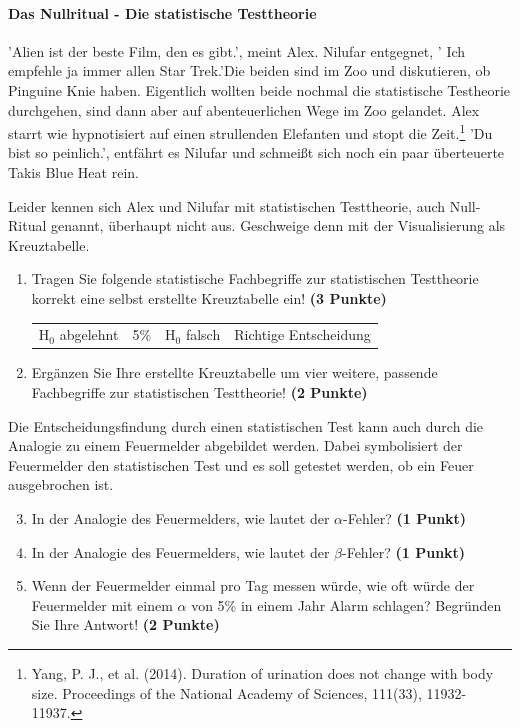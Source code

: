 \documentclass[a4paper, 9pt]{scrartcl}\usepackage[]{graphicx}\usepackage[]{xcolor}
\begin{document}
\ifcollection
\paragraph{Das Nullritual - Die statistische Testtheorie}
\fi

'Alien ist der beste Film, den es gibt.', meint Alex. Nilufar entgegnet, ' Ich empfehle ja immer allen Star Trek.'Die beiden sind im Zoo und diskutieren, ob Pinguine Knie haben. Eigentlich wollten beide nochmal die statistische Testheorie durchgehen, sind dann aber auf abenteuerlichen Wege im Zoo gelandet. Alex starrt wie hypnotisiert auf einen strullenden Elefanten und stopt die Zeit.\footnote{Yang, P. J., et al. (2014). Duration of urination does not change with body size. Proceedings of the National Academy of Sciences, 111(33), 11932-11937.} 'Du bist so peinlich.', entfährt es Nilufar und schmeißt sich noch ein paar überteuerte Takis Blue Heat rein.

\vspace{1ex}

Leider kennen sich Alex und Nilufar mit statistischen Testtheorie, auch Null-Ritual genannt, überhaupt nicht aus. Geschweige denn mit der Visualisierung als Kreuztabelle.  

\begin{enumerate}
\item Tragen Sie folgende statistische Fachbegriffe zur statistischen Testtheorie korrekt eine selbst erstellte Kreuztabelle ein! \textbf{(3 Punkte)}
  \begin{center}
  \begin{tabular}{cccc}
  H$_0$ abgelehnt & 5\% & H$_0$ falsch & Richtige Entscheidung \\
  \end{tabular}
  \end{center}
\item Ergänzen Sie Ihre erstellte Kreuztabelle um vier weitere, passende Fachbegriffe zur statistischen Testtheorie! \textbf{(2 Punkte)}
\end{enumerate}

Die Entscheidungsfindung durch einen statistischen Test kann auch durch die Analogie zu einem Feuermelder abgebildet werden. Dabei symbolisiert der Feuermelder den statistischen Test und es soll getestet werden, ob ein Feuer ausgebrochen ist.

\begin{enumerate}
  \setcounter{enumi}{2}    
\item In der Analogie des Feuermelders, wie lautet der $\alpha$-Fehler? \textbf{(1 Punkt)}
\item In der Analogie des Feuermelders, wie lautet der $\beta$-Fehler? \textbf{(1 Punkt)}
\item Wenn der Feuermelder einmal pro Tag messen würde, wie oft würde der Feuermelder mit einem $\alpha$ von 5\% in einem Jahr Alarm schlagen? Begründen Sie Ihre Antwort! \textbf{(2 Punkte)}
\end{enumerate}
\end{document}
